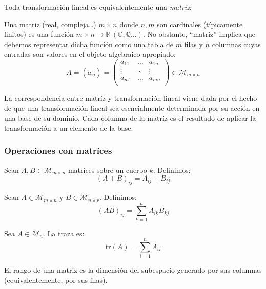 \documentclass[10pt]{article}
\newcommand{\Q}{\mathbb{Q}}
\newcommand{\R}{\mathbb{R}}
\newcommand{\C}{\mathbb{C}}
\begin{document}
Toda transformación lineal es equivalentemente una \textit{matríz}:

\begin{definition}
  Una matríz (real, compleja\dots) $  m \times n $ donde $ n, m $ son cardinales (típicamente finitos) es una función $  m \times n \to \R \, (\C, \Q\dots) $. No obstante,
  ``matriz'' implica que debemos representar dicha función como una tabla de $ m $ filas y $ n $ columnas cuyas entradas son valores en el objeto algebraico apropiado:
  \[
    A = (a_{ij}) = 
    \begin{pmatrix}
      a_{11} & \dots & a_{1n} \\
      \vdots & \ddots & \vdots \\
      a_{m1} & \dots & a_{mn} \\
    \end{pmatrix}
    \in \mathcal{M}_{ m \times n}
  \]
\end{definition}

La correspondencia entre matríz y transformación lineal viene dada por el hecho de que una transformación lineal sea esencialmente determinada por su acción en una base de 
su dominio. Cada columna de la matríz es el resultado de aplicar la transformación a un elemento de la base.

\subsubsection{Operaciones con matríces}

\begin{definition}
  Sean $ A, B \in \mathcal{M}_{ m \times n} $ matríces sobre un cuerpo $ k $. Definimos:
  \[ (A + B)_{ij} = A_{ij} + B_{ij} \]
\end{definition}

\begin{definition}
  Sean $ A \in \mathcal{M}_{ m \times n} $ y $ B \in \mathcal{M}_{ n \times r} $. Definimos:
  \[ (AB)_{ij} = \sum_{k=1}^n A_{ik} B_{kj} \]
\end{definition}

\begin{definition}
  Sea $ A \in \mathcal{M}_{n} $. La traza es:
  \[ \text{tr}(A) = \sum_{i=1}^n A_{ii} \]
\end{definition}

\begin{definition}
  El rango de una matriz es la dimensión del subespacio generado por sus columnas (equivalentemente, por sus filas).
\end{definition}
\end{document}
